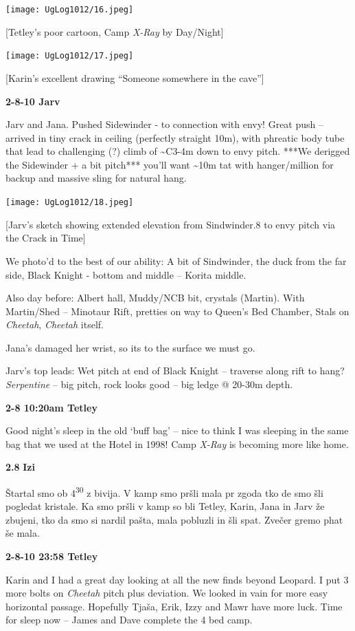 \texttt{[image: UgLog1012/16.jpeg]}

{[}Tetley's poor cartoon, Camp \emph{X-Ray} by Day/Night{]}

\texttt{[image: UgLog1012/17.jpeg]}

{[}Karin's excellent drawing ``Someone somewhere in the cave''{]}

\textbf{2-8-10 Jarv}

Jarv and Jana. Pushed Sidewinder - to connection with envy! Great push
-- arrived in tiny crack in ceiling (perfectly straight 10m), with
phreatic body tube that lead to challenging (?) climb of
\textasciitilde{}C3-4m down to envy pitch. ***We derigged the Sidewinder
+ a bit pitch*** you'll want \textasciitilde{}10m tat with
hanger/million for backup and massive sling for natural hang.

\texttt{[image: UgLog1012/18.jpeg]}

{[}Jarv's sketch showing extended elevation from Sindwinder.8 to envy
pitch via the Crack in Time{]}

We photo'd to the best of our ability: A bit of Sindwinder, the duck
from the far side, Black Knight - bottom and middle -- Korita middle.

Also day before: Albert hall, Muddy/NCB bit, crystals (Martin). With
Martin/Shed -- Minotaur Rift, pretties on way to Queen's Bed Chamber,
Stals on \emph{Cheetah}, \emph{Cheetah} itself.

Jana's damaged her wrist, so its to the surface we must go.

Jarv's top leads: Wet pitch at end of Black Knight -- traverse along
rift to hang? \emph{Serpentine} -- big pitch, rock looks good -- big
ledge @ 20-30m depth.

\textbf{2-8 10:20am Tetley}

Good night's sleep in the old `buff bag' -- nice to think I was sleeping
in the same bag that we used at the Hotel in 1998! Camp \emph{X-Ray} is
becoming more like home.

\textbf{2.8} \textbf{Izi}

Štartal smo ob 4\textsuperscript{30} z bivija. V kamp smo pršli mala pr
zgoda tko de smo šli pogledat kristale. Ka smo pršli v kamp so bli
Tetley, Karin, Jana in Jarv že zbujeni, tko da smo si nardil pašta, mala
pobluzli in šli spat. Zvečer gremo phat še mala.

\textbf{2-8-10 23:58 Tetley}

Karin and I had a great day looking at all the new finds beyond Leopard.
I put 3 more bolts on \emph{Cheetah} pitch plus deviation. We looked in
vain for more easy horizontal passage. Hopefully Tjaša, Erik, Izzy and
Mawr have more luck. Time for sleep now -- James and Dave complete the 4
bed camp.


